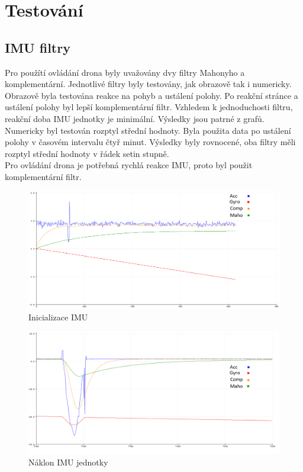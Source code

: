 \chapter{Testování}
\label{6-testovani}

\section{IMU filtry}
Pro použítí ovládání drona byly uvažovány dvy filtry Mahonyho a komplementární. Jednotlivé filtry byly testovány, jak obrazově tak i numericky.\\
Obrazově byla testována reakce na pohyb a ustálení polohy.
Po reakční stránce a ustálení  polohy byl lepší komplementární filtr. Vzhledem k jednoduchosti filtru, reakční doba IMU jednotky je minimální. Výsledky jsou patrné z grafů.\\
Numericky byl testován rozptyl střední hodnoty. Byla použita data po ustálení polohy v časovém intervalu čtyř minut. Výsledky byly rovnocené, oba filtry měli rozptyl střední hodnoty v řádek setin stupně.\\
Pro ovládání drona je potřebná rychlá reakce IMU, proto byl použit komplementární filtr.\\
\begin{figure}[h]
	\centering
	\includegraphics[width=14cm]{pictures/testRoll}
	\caption{Inicializace IMU}
\end{figure}

\begin{figure}[h]
	\centering
	\includegraphics[width=14cm]{pictures/testRoll1}
	\caption{Náklon IMU jednotky}
\end{figure}

